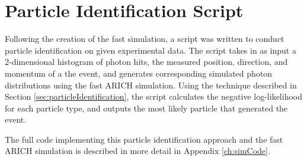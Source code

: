 \section{Particle Identification Script}
\label{sec:multi}
Following the creation of the fast simulation, a script was written to conduct particle identification on given experimental data.
The script takes in as input a 2-dimensional histogram of photon hits, the measured position, direction, and momentum of a the event, and generates corresponding simulated photon distributions using the fast ARICH simulation.
Using the technique described in Section \ref{sec:particleIdentification}, the script calculates the negative log-likelihood for each particle type, and outputs the most likely particle that generated the event.

The full code implementing this particle identification approach and the fast ARICH simulation is described in more detail in Appendix \ref{ch:simCode}.

\endinput



\section{Comparison with Geant4} 
In this section, I will compare the simulated photon distribution between my simulation and the full Geant4 simulation.
They will be compared on a number of metrics, including the number of photons detected in the photon ring, and the level of background photons (determined by taking the ratio of histograms simulated by my simulation and by Geant4). This work is in progress: comparisons have been done, but it is still necessary to more accurately quantify the differences between the two simulations and display these results. I will describe the differences between my simulation and the full Geant4 simulation, and make the claim that my simulation contains enough of the necessary physics to simulate Cherenkov photons with sufficient accuracy for our purposes.

\section{Mirror}
In order to 


Any text after an \endinput is ignored.
You could put scraps here or things in progress.
